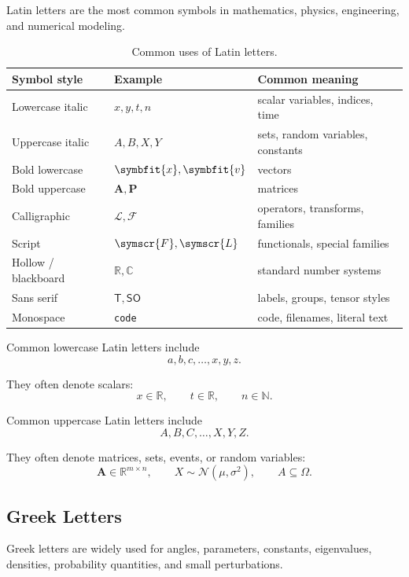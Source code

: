 \documentclass[11pt,twocolumn]{article}
\newcommand{\N}{\mathbb{N}}
\newcommand{\R}{\mathbb{R}}
\newcommand{\vct}[1]{\symbfit{#1}}   %
\newcommand{\mat}[1]{\symbf{#1}}     %
\newcommand{\Normal}{\mathcal{N}}
\begin{document}
Latin letters are the most common symbols in mathematics, physics, engineering,
and numerical modeling.

\begin{table}[ht]
\centering
\caption{Common uses of Latin letters.}
\begin{tabular}{lll}
\toprule
Symbol style & Example & Common meaning \\
\midrule
Lowercase italic & $x,y,t,n$ & scalar variables, indices, time \\
Uppercase italic & $A,B,X,Y$ & sets, random variables, constants \\
Bold lowercase & $\vct{x},\vct{v}$ & vectors \\
Bold uppercase & $\mat{A},\mat{P}$ & matrices \\
Calligraphic & $\mathcal{L},\mathcal{F}$ & operators, transforms, families \\
Script & $\symscr{F},\symscr{L}$ & functionals, special families \\
Hollow / blackboard & $\mathbb{R},\mathbb{C}$ & standard number systems \\
Sans serif & $\mathsf{T},\mathsf{SO}$ & labels, groups, tensor styles \\
Monospace & \texttt{code} & code, filenames, literal text \\
\bottomrule
\end{tabular}
\end{table}

Common lowercase Latin letters include
\[
a,b,c,\ldots,x,y,z.
\]

They often denote scalars:
\[
x \in \R,
\qquad
t \in \R,
\qquad
n \in \N.
\]

Common uppercase Latin letters include
\[
A,B,C,\ldots,X,Y,Z.
\]

They often denote matrices, sets, events, or random variables:
\[
\mat{A}\in\R^{m\times n},
\qquad
X \sim \Normal(\mu,\sigma^2),
\qquad
A \subseteq \Omega.
\]

\subsection{Greek Letters}

Greek letters are widely used for angles, parameters, constants, eigenvalues,
densities, probability quantities, and small perturbations.
\end{document}
